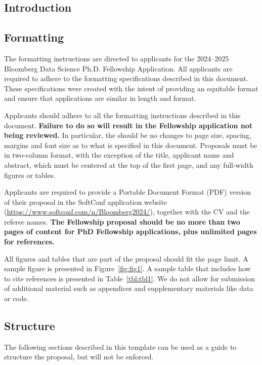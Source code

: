 \documentclass[10pt]{article}
\begin{document}
\begin{multicols*}{2}

\section{Introduction}
 
\subsection{Formatting} 
 
The formatting instructions are directed to applicants for the 2024--2025 Bloomberg Data Science Ph.D. Fellowship Application. All applicants are required to adhere to the formatting specifications described in this document. These specifications were created with the intent of providing an equitable format and ensure that applications are similar in length and format.

Applicants should adhere to all the formatting instructions described in this document. \textbf{Failure to do so will result in the Fellowship application not being reviewed.} In particular, the should be no changes to page size, spacing, margins and font size as to what is specified in this document.
Proposals must be in two-column format, with the exception of the title, applicant name and abstract, which must be centered at the top of the first page, and any full-width figures or tables.

Applicants are required to provide a Portable Document Format (PDF) version of their proposal in the SoftConf application website (\url{https://www.softconf.com/n/Bloomberg2024/}), together with the CV and the referee names. \textbf{The Fellowship proposal should be no more than two pages of content for PhD Fellowship applications, plus unlimited pages for references.}

All figures and tables that are part of the proposal should fit the page limit. A sample figure is presented in Figure~\ref{fig:fig1}. A sample table that includes how to cite references is presented in Table~\ref{tbl:tbl1}. We do not allow for submission of additional material such as appendices and supplementary materials like data or code.

\subsection{Structure} 

The following sections described in this template can be used as a guide to structure the proposal, but will not be enforced.


\end{multicols*}
\end{document}
